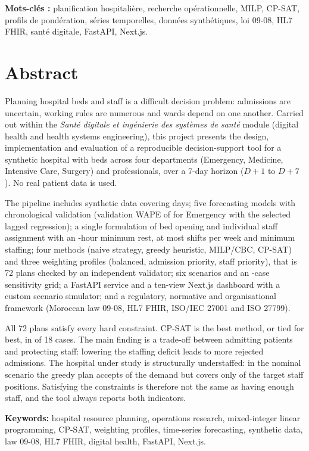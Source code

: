 \vspace{0.5cm}
\noindent\textbf{Mots-clés :} planification hospitalière, recherche opérationnelle, MILP, CP-SAT, profils de pondération, séries temporelles, données synthétiques, loi 09-08, HL7 FHIR, santé digitale, FastAPI, Next.js.

\vspace{1cm}
\chapter*{Abstract}

Planning hospital beds and staff is a difficult decision problem: admissions are uncertain, working rules are numerous and wards depend on one another. Carried out within the \textit{Santé digitale et ingénierie des systèmes de santé} module (digital health and health systems engineering), this project presents the design, implementation and evaluation of a reproducible decision-support tool for a synthetic hospital with \NbLits{} beds across four departments (Emergency, Medicine, Intensive Care, Surgery) and \NbAgents{} professionals, over a 7-day horizon ($D+1$ to $D+7$). No real patient data is used.

The pipeline includes synthetic data covering \NbJours{} days; five forecasting models with chronological validation (validation WAPE of \WapeValUrg{} for Emergency with the selected lagged regression); a single formulation of bed opening and individual staff assignment with an \ReposMin{}-hour minimum rest, at most \PostesMax{} shifts per week and minimum staffing; four methods (naive strategy, greedy heuristic, MILP/CBC, CP-SAT) and three weighting profiles (balanced, admission priority, staff priority), that is 72 plans checked by an independent validator; six scenarios and an \NbCas{}-case sensitivity grid; a FastAPI service and a ten-view Next.js dashboard with a custom scenario simulator; and a regulatory, normative and organisational framework (Moroccan law 09-08, HL7 FHIR, ISO/IEC 27001 and ISO 27799).

All 72 plans satisfy every hard constraint. CP-SAT is the best method, or tied for best, in \NbCpMeilleur{} of 18 cases. The main finding is a trade-off between admitting patients and protecting staff: lowering the staffing deficit leads to more rejected admissions. The hospital under study is structurally understaffed: in the nominal scenario the greedy plan accepts \CouvDemSzGreedy{} of the demand but covers only \CouvSzGreedy{} of the target staff positions. Satisfying the constraints is therefore not the same as having enough staff, and the tool always reports both indicators.

\vspace{0.5cm}
\noindent\textbf{Keywords:} hospital resource planning, operations research, mixed-integer linear programming, CP-SAT, weighting profiles, time-series forecasting, synthetic data, law 09-08, HL7 FHIR, digital health, FastAPI, Next.js.
